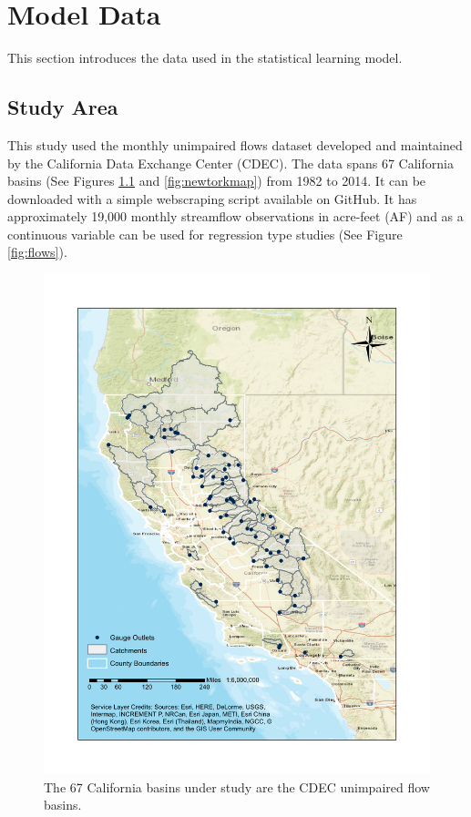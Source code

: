 \chapter{Model Data} \label{a:data}
This section introduces the data used in the statistical learning model. 

\section*{Study Area}
This study used the monthly unimpaired flows dataset developed and maintained by the California Data Exchange Center (CDEC). The data spans 67 California basins (See Figures \ref{fig:map} and \ref{fig:newtorkmap}) from 1982 to 2014. It can be downloaded with a simple webscraping script available on GitHub. It has approximately 19,000 monthly streamflow observations in acre-feet (AF) and as a continuous variable can be used for regression type studies (See Figure \ref{fig:flows}). 

\begin{figure}
	\centering
	\includegraphics[width=\textwidth,trim={1.5cm 1.5cm 1.5cm 1.5cm},clip=true]{plots/watersheds.pdf}
	\caption{The 67 California basins under study are the CDEC unimpaired flow basins.} 
	\label{fig:map}
\end{figure}

